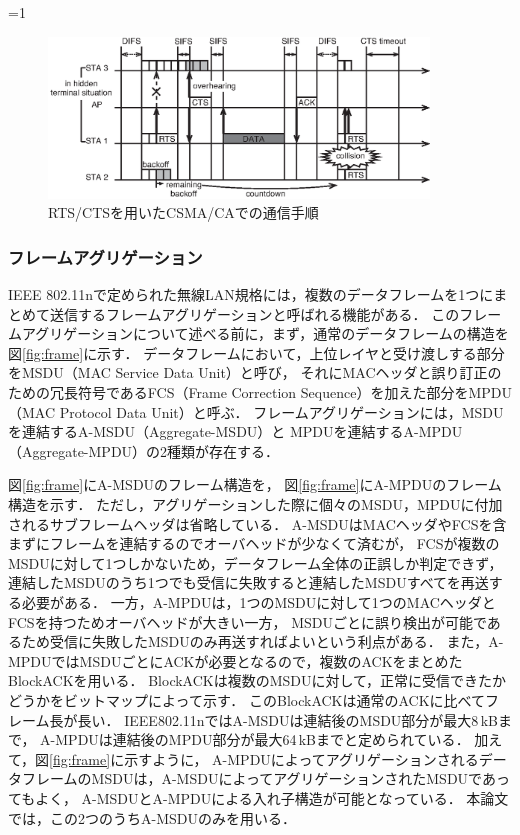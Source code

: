 \documentclass[master]{kuisthesis}		%
\newcounter{flagFig}
\begin{document}
			\ifnum\value{flagFig}=1 {\begin{figure}[t]
				\begin{center}
					\includegraphics[width=0.9\textwidth]{fig/rtscts2.eps}
					\caption{RTS/CTSを用いたCSMA/CAでの通信手順}
					\label{fig:rtscts}
				\end{center}
			\end{figure}}\fi

		\subsubsection{フレームアグリゲーション}
			{IEEE} 802.11nで定められた無線LAN規格には，複数のデータフレームを1つにまとめて送信するフレームアグリゲーションと呼ばれる機能がある\cite{stdn}．
			このフレームアグリゲーションについて述べる前に，まず，通常のデータフレームの構造を図\ref{fig:frame}に示す．
			データフレームにおいて，上位レイヤと受け渡しする部分をMSDU（MAC Service Data Unit）と呼び，
			それにMACヘッダと誤り訂正のための冗長符号であるFCS（Frame Correction Sequence）を加えた部分をMPDU（MAC Protocol Data Unit）と呼ぶ．
			フレームアグリゲーションには，MSDUを連結するA-MSDU（Aggregate-MSDU）と
			MPDUを連結するA-MPDU（Aggregate-MPDU）の2種類が存在する．

			\par
			図\ref{fig:frame}にA-MSDUのフレーム構造を，
			図\ref{fig:frame}にA-MPDUのフレーム構造を示す．
			ただし，アグリゲーションした際に個々のMSDU，MPDUに付加されるサブフレームヘッダは省略している．
			A-MSDUはMACヘッダやFCSを含まずにフレームを連結するのでオーバヘッドが少なくて済むが，
			FCSが複数のMSDUに対して1つしかないため，データフレーム全体の正誤しか判定できず，
			連結したMSDUのうち1つでも受信に失敗すると連結したMSDUすべてを再送する必要がある．
			一方，A-MPDUは，1つのMSDUに対して1つのMACヘッダとFCSを持つためオーバヘッドが大きい一方，
			MSDUごとに誤り検出が可能であるため受信に失敗したMSDUのみ再送すればよいという利点がある．
			また，A-MPDUではMSDUごとにACKが必要となるので，複数のACKをまとめたBlockACKを用いる．
			BlockACKは複数のMSDUに対して，正常に受信できたかどうかをビットマップによって示す．
			このBlockACKは通常のACKに比べてフレーム長が長い．
			IEEE802.11nではA-MSDUは連結後のMSDU部分が最大8\,kBまで，
			A-MPDUは連結後のMPDU部分が最大64\,kBまでと定められている\cite{stdn}．
			加えて，図\ref{fig:frame}に示すように，
			A-MPDUによってアグリゲーションされるデータフレームのMSDUは，A-MSDUによってアグリゲーションされたMSDUであってもよく，
			A-MSDUとA-MPDUによる入れ子構造が可能となっている．
			本論文では，この2つのうちA-MSDUのみを用いる．
\end{document}
